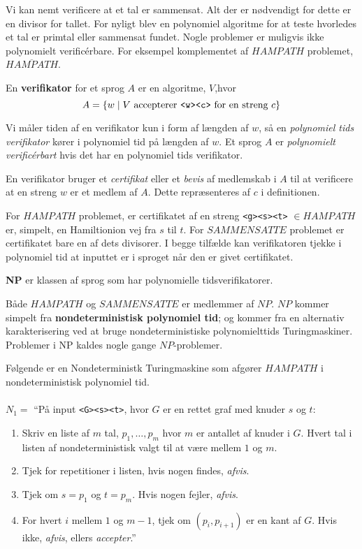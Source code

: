 Vi kan nemt verificere at et tal er sammensat. Alt der er nødvendigt for dette er en divisor for tallet. For nyligt blev en polynomiel algoritme for at teste hvorledes et tal er primtal eller sammensat fundet. Nogle problemer er muligvis ikke polynomielt verificérbare. For eksempel komplementet af $HAMPATH$ problemet, $\overline{HAMPATH}$.

\begin{definition}
	En \textbf{verifikator} for et sprog $A$ er en algoritme, $V$,hvor
	\begin{equation*}
		A = \{w \mid V \text{ accepterer \texttt{<w><c>} for en streng }c \}
	\end{equation*}

	Vi måler tiden af en verifikator kun i form af længden af $w$, så en \textit{polynomiel tids verifikator} kører i polynomiel tid på længden af $w$. Et sprog $A$ er \textit{polynomielt verificérbart} hvis det har en polynomiel tids verifikator.
\end{definition}

En verifikator bruger et \textit{certifikat} eller et \textit{bevis} af medlemskab i $A$ til at verificere at en streng $w$ er et medlem af $A$. Dette repræsenteres af $c$ i definitionen.

For $HAMPATH$ problemet, er certifikatet af en streng \texttt{<g><s><t>} $\in HAMPATH$ er, simpelt, en Hamiltionion vej fra $s$ til $t$. For $SAMMENSATTE$ problemet er certifikatet bare en af dets divisorer. I begge tilfælde kan verifikatoren tjekke i polynomiel tid at inputtet er i sproget når den er givet certifikatet.

\begin{definition}
	\textbf{NP} er klassen af sprog som har polynomielle tidsverifikatorer.
\end{definition}

Både $HAMPATH$ og $SAMMENSATTE$ er medlemmer af $NP$. $NP$ kommer simpelt fra \textbf{nondeterministisk polynomiel tid}; og kommer fra en alternativ karakterisering ved at bruge nondeterministiske polynomielttids Turingmaskiner. Problemer i NP kaldes nogle gange $NP$-problemer.

Følgende er en Nondeterministk Turingmaskine som afgører $HAMPATH$ i nondeterministisk polynomiel tid.\\\\
\noindent
$N_{1} = $ ``På input \texttt{<G><s><t>}, hvor $G$ er en rettet graf med knuder $s$ og $t$:
\begin{enumerate}
	\item Skriv en liste af $m$ tal, $p_{1}, \ldots, p_{m}$ hvor $m$ er antallet af knuder i $G$. Hvert tal i listen af nondeterministisk valgt til at være mellem $1$ og $m$.
	\item Tjek for repetitioner i listen, hvis nogen findes, \textit{afvis}.
	\item Tjek om $s = p_{1}$ og $t = p_{m}$. Hvis nogen fejler, \textit{afvis}.
	\item For hvert $i$ mellem $1$ og $m-1$, tjek om $(p_{i}, p_{i+1})$ er en kant af $G$. Hvis ikke, \textit{afvis}, ellers \textit{accepter}.''
\end{enumerate}

